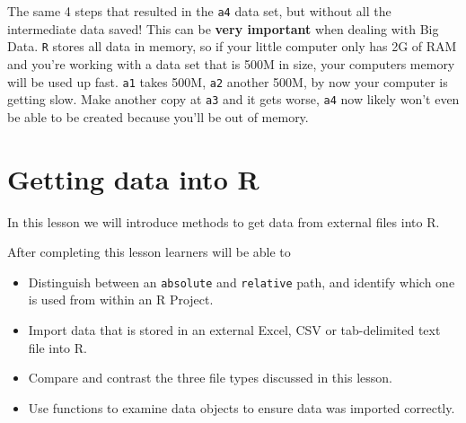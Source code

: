 \documentclass[
  letterpaper,
  DIV=11,
  numbers=noendperiod,
  oneside]{scrreprt}
\providecommand{\tightlist}{%
  \setlength{\itemsep}{0pt}\setlength{\parskip}{0pt}}\usepackage{longtable,booktabs,array}
\begin{document}
The same 4 steps that resulted in the \texttt{a4} data set, but without
all the intermediate data saved! This can be \textbf{very important}
when dealing with Big Data. \texttt{R} stores all data in memory, so if
your little computer only has 2G of RAM and you're working with a data
set that is 500M in size, your computers memory will be used up fast.
\texttt{a1} takes 500M, \texttt{a2} another 500M, by now your computer
is getting slow. Make another copy at \texttt{a3} and it gets worse,
\texttt{a4} now likely won't even be able to be created because you'll
be out of memory.

\chapter{Getting data into R}\label{sec-import}

In this lesson we will introduce methods to get data from external files
into R.

\begin{tcolorbox}[enhanced jigsaw, bottomrule=.15mm, colback=white, colframe=quarto-callout-note-color-frame, toprule=.15mm, coltitle=black, rightrule=.15mm, opacitybacktitle=0.6, colbacktitle=quarto-callout-note-color!10!white, toptitle=1mm, leftrule=.75mm, breakable, bottomtitle=1mm, titlerule=0mm, title={🎓 Learning Objectives}, arc=.35mm, left=2mm, opacityback=0]

After completing this lesson learners will be able to

\begin{itemize}
\tightlist
\item
  Distinguish between an \texttt{absolute} and \texttt{relative} path,
  and identify which one is used from within an R Project.
\item
  Import data that is stored in an external Excel, CSV or tab-delimited
  text file into R.
\item
  Compare and contrast the three file types discussed in this lesson.
\item
  Use functions to examine data objects to ensure data was imported
  correctly.
\end{itemize}

\end{tcolorbox}
\end{document}
